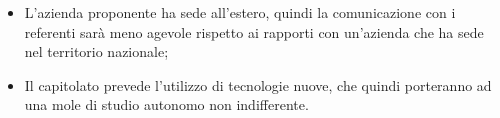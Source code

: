 \begin{itemize}

\item L'azienda proponente ha sede all'estero, quindi la comunicazione con i referenti sarà meno agevole rispetto ai rapporti con un'azienda che ha sede nel territorio nazionale;
\item Il capitolato prevede l'utilizzo di tecnologie nuove, che quindi porteranno ad una mole di studio autonomo non indifferente.

\end{itemize}